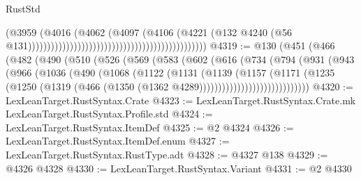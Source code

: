 \begin{lexlean}{RustStd}
\begin{coremodule}
{\begin{coremodule}
{{{{{{{{{{{{{{{{{{{{{{{{{{{{{{{{{{{{{{{{{{{{{{{{{{{{{{{{{{{{{{{{{{{{{{{{{{{{{{{{                                                                                  (@3959
                                                                                    (@4016
                                                                                      (@4062
                                                                                        (@4097
                                                                                          (@4106
                                                                                            (@4221
                                                                                              (@132
                                                                                                @4240
                                                                                                (@56
                                                                                                  @131)))))))))))))))))))))))))))))))))))))))))))))))
@4319 := @130
    (@451
      (@466
        (@482
          (@490
            (@510
              (@526
                (@569
                  (@583
                    (@602
                      (@616
                        (@734
                          (@794
                            (@931
                              (@943
                                (@966
                                  (@1036
                                    (@490
                                      (@1068
                                        (@1122
                                          (@1131
                                            (@1139
                                              (@1157
                                                (@1171
                                                  (@1235
                                                    (@1250
                                                      (@1319
                                                        (@466
                                                          (@1350
                                                            (@1362
                                                              @4289)))))))))))))))))))))))))))))
@4320 := LexLeanTarget.RustSyntax.Crate
@4323 := LexLeanTarget.RustSyntax.Crate.mk LexLeanTarget.RustSyntax.Profile.std
@4324 := LexLeanTarget.RustSyntax.ItemDef
@4325 := @2 @4324
@4326 := LexLeanTarget.RustSyntax.ItemDef.enum
@4327 := LexLeanTarget.RustSyntax.RustType.adt
@4328 := @4327 @138
@4329 := @4326 @4328
@4330 := LexLeanTarget.RustSyntax.Variant
@4331 := @2 @4330
}}}}}}}}}}}}}}}}}}}}}}}}}}}}}}}}}}}}}}}}}}}}}}}}}}}}}}}}}}}}}}}}}}}}}}}}}}}}}}}}
\end{coremodule}}
\end{coremodule}
\end{lexlean}
